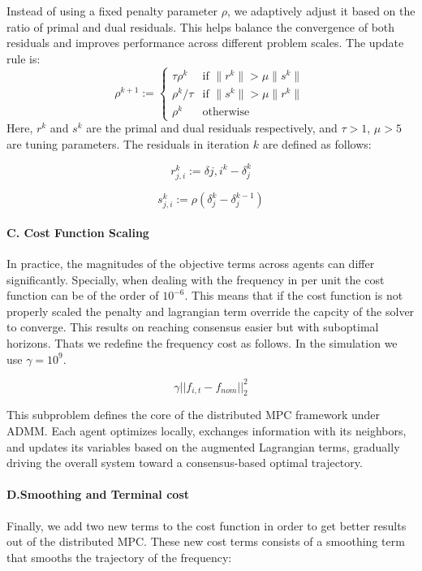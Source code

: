 \documentclass{article}
\begin{document}
Instead of using a fixed penalty parameter \( \rho \), we adaptively adjust it based on the ratio of primal and dual residuals. This helps balance the convergence of both residuals and improves performance across different problem scales. The update rule is:
\[
\rho^{k+1} := 
\begin{cases}
\tau \rho^k & \text{if } \|r^k\| > \mu \|s^k\| \\
\rho^k / \tau & \text{if } \|s^k\| > \mu \|r^k\| \\
\rho^k & \text{otherwise}
\end{cases}
\]
Here, \( r^k \) and \( s^k \) are the primal and dual residuals respectively, and \( \tau > 1 \), \( \mu > 5 \) are tuning parameters. The residuals in iteration $k$ are defined as follows:

\[
r_{j,i}^k := \delta{j,i}^k - \delta_j^k
\]

\[
s_{j,i}^k := \rho \left( \delta_j^k - \delta_j^{k-1} \right)
\]

\paragraph{C. Cost Function Scaling} 
In practice, the magnitudes of the objective terms across agents can differ significantly. Specially, when dealing with the frequency in per unit the cost function can be of the order of $10^{-6}$. This means that if the cost function is not properly scaled the penalty and lagrangian term override the capcity of the solver to converge. This results on reaching consensus easier but with suboptimal horizons. Thats we redefine the frequency cost as follows. In the simulation we use $\gamma = 10^9$.

\begin{equation}
    \gamma ||f_{i,t} - f_{nom}||_2^2
\end{equation}

This subproblem defines the core of the distributed MPC framework under ADMM. Each agent optimizes locally, exchanges information with its neighbors, and updates its variables based on the augmented Lagrangian terms, gradually driving the overall system toward a consensus-based optimal trajectory.

\paragraph{D.Smoothing and Terminal cost} 

Finally, we add two new terms to the cost function in order to get better results out of the distributed MPC. These new cost terms consists of a smoothing term that smooths the trajectory of the frequency:
\end{document}
